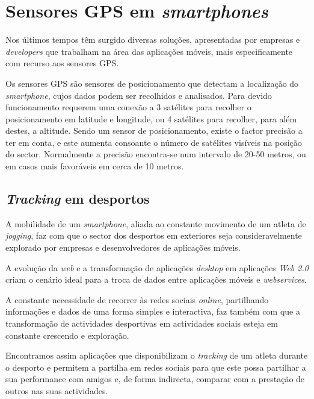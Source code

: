 \documentclass[twocolumn,twoside,10pt,a4paper]{article}
\begin{document}
\section{Sensores GPS em \emph{smartphones}}\label{sec:estart}

Nos últimos tempos têm surgido diversas soluções, apresentadas por empresas e \emph{developers} que trabalham na área das aplicações móveis, mais especificamente com recurso aos sensores GPS.

Os sensores GPS são sensores de posicionamento que detectam a localização do \emph{smartphone}, cujos dados podem ser recolhidos e analisados. Para devido funcionamento requerem uma conexão a 3 satélites para recolher o posicionamento em latitude e longitude, ou 4 satélites para recolher, para além destes, a altitude.
Sendo um sensor de posicionamento, existe o factor precisão a ter em conta, e este aumenta consoante o número de satélites visíveis na posição do sector. Normalmente a precisão encontra-se num intervalo de 20-50 metros, ou em casos mais favoráveis em cerca de 10 metros.


\subsection{\emph{Tracking} em desportos}

A mobilidade de um \emph{smartphone}, aliada ao constante movimento de um atleta de \emph{jogging}, faz com que o sector dos desportos em exteriores seja consideravelmente explorado por empresas e desenvolvedores de aplicações móveis. 

A evolução da \emph{web} e a transformação de aplicações \emph{desktop} em aplicações \emph{Web 2.0} criam o cenário ideal para a troca de dados entre aplicações móveis e \emph{webservices}.

A constante necessidade de recorrer às redes sociais \emph{online}, partilhando informações e dados de uma forma simples e interactiva, faz também com que a transformação de actividades desportivas em actividades sociais esteja em constante crescendo e exploração.
 
Encontramos assim aplicações que disponibilizam o \emph{tracking} de um atleta durante o desporto e permitem a partilha em redes sociais para que este possa partilhar a sua performance com amigos e, de forma indirecta, comparar com a prestação de outros nas suas actividades.
\end{document}
